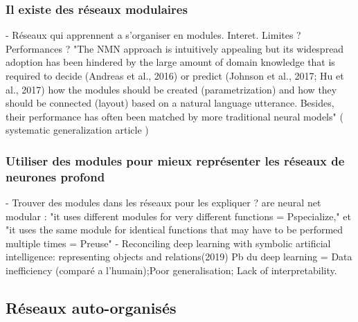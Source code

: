 \subsubsection{Il existe des réseaux modulaires}
- Réseaux qui apprennent a s'organiser en modules. Interet. Limites ? Performances ? \cite{Andreas2016NeuralMN,Kirsch2018ModularNL}
"The NMN approach is intuitively appealing but its
widespread adoption has been hindered by the large amount of domain knowledge that is required
to decide (Andreas et al., 2016) or predict (Johnson et al., 2017; Hu et al., 2017) how the modules
should be created (parametrization) and how they should be connected (layout) based on a natural
language utterance. Besides, their performance has often been matched by more traditional neural
models" ( systematic generalization article ) 

\subsubsection{Utiliser des modules pour mieux représenter les réseaux de neurones profond}
- Trouver des modules dans les réseaux pour les expliquer ? \cite{Watanabe2018ModularRO,Csordas2021AreNN}
are neural net modular : "it uses different modules for very different functions = Pspecialize," et "it uses the same module for identical functions that
may have to be performed multiple times = Preuse"
- Reconciling deep learning with symbolic artificial intelligence: representing objects and relations(2019)
Pb du deep learning = Data inefficiency (comparé a l'humain);Poor generalisation; Lack of interpretability.

\subsection{Réseaux auto-organisés}

